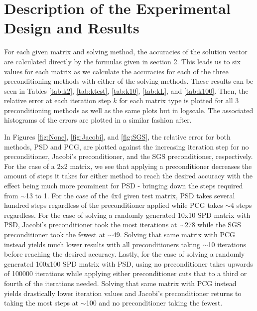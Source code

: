 \documentclass[11pt]{article}
\begin{document}
\section{Description of the Experimental Design and Results}

For each given matrix and solving method, the accuracies of the solution vector are calculated directly by the formulas given in section 2. This leads us to six values for each matrix as we calculate the accuracies for each of the three preconditioning methods with either of the solving methods. These results can be seen in Tables \ref{tab:k2}, \ref{tab:ktest}, \ref{tab:k10}, \ref{tab:kL}, and \ref{tab:k100}. Then, the relative error at each iteration step $k$ for each matrix type is plotted for all 3 preconditioning methods as well as the same plots but in logscale. The associated histograms of the errors are plotted in a similar fashion after. 

In Figures \ref{fig:None}, \ref{fig:Jacobi}, and \ref{fig:SGS}, the relative error for both methods, PSD and PCG, are plotted against the increasing iteration step for no preconditioner, Jacobi's preconditioner, and the SGS preconditioner, respectively. For the case of a 2x2 matrix, we see that applying a preconditioner decreases the amount of steps it takes for either method to reach the desired accuracy with the effect being much more prominent for PSD - bringing down the steps required from $\sim$13 to 1. For the case of the 4x4 given test matrix, PSD takes several hundred steps regardless of the preconditioner applied while PCG takes $\sim$4 steps regardless. For the case of solving a randomly generated 10x10 SPD matrix with PSD, Jacobi's preconditioner took the most iterations at $\sim$278 while the SGS preconditioner took the fewest at $\sim$49. Solving that same matrix with PCG instead yields much lower results with all preconditioners taking $\sim$10 iterations before reaching the desired accuracy. Lastly, for the case of solving a randomly generated 100x100 SPD matrix with PSD, using no preconditioner takes upwards of 100000 iterations while applying either preconditioner cuts that to a third or fourth of the iterations needed. Solving that same matrix with PCG instead yields drastically lower iteration values and Jacobi's preconditioner returns to taking the most steps at $\sim$100 and no preconditioner taking the fewest.
\end{document}
